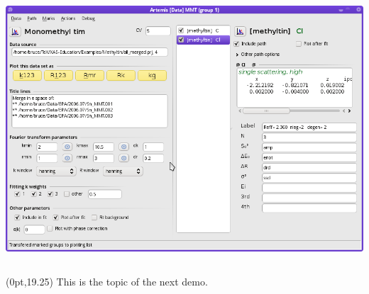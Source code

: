 \documentclass[10pt, xcolor=x11names, compress]{beamer}
\begin{document}
\begin{frame}
\begin{columns}
\begin{column}{0.5\linewidth}
      \smallskip

      \includegraphics[width=0.8\linewidth]{images/mtin_fit2.png}
    \end{column}
  \end{columns}
  \begin{textblock*}{0.5\linewidth}(0pt,19.25\TPVertModule)
    \tiny%
    This is the topic of the next demo.
  \end{textblock*}
\end{frame}
\end{document}
